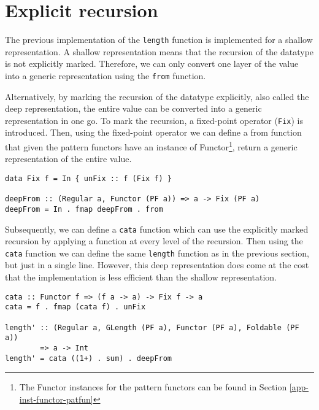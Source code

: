 \section{Explicit recursion}
\label{sec-explicit-recursion}


The previous implementation of the \texttt{length} function is implemented for a shallow representation. A shallow representation means that the recursion of the datatype is not explicitly marked. Therefore, we can only convert one layer of the value into a generic representation using the \texttt{from} function. 

Alternatively, by marking the recursion of the datatype explicitly, also called the deep representation, the entire value can be converted into a generic representation in one go. To mark the recursion, a fixed-point operator (\texttt{Fix}) is introduced. Then, using the fixed-point operator we can define a from function that given the pattern functors have an instance of Functor\footnote{The Functor instances for the pattern functors can be found in Section \ref{app-inst-functor-patfun}}, return a generic representation of the entire value.

\begin{verbatim}
data Fix f = In { unFix :: f (Fix f) }

deepFrom :: (Regular a, Functor (PF a)) => a -> Fix (PF a)
deepFrom = In . fmap deepFrom . from
\end{verbatim}

Subsequently, we can define a \texttt{cata} function which can use the explicitly marked recursion by applying a function at every level of the recursion. Then using the \texttt{cata} function we can define the same \texttt{length} function as in the previous section, but just in a single line. However, this deep representation does come at the cost that the implementation is less efficient than the shallow representation. 

\begin{verbatim}
cata :: Functor f => (f a -> a) -> Fix f -> a
cata = f . fmap (cata f) . unFix

length' :: (Regular a, GLength (PF a), Functor (PF a), Foldable (PF a)) 
        => a -> Int
length' = cata ((1+) . sum) . deepFrom
\end{verbatim}